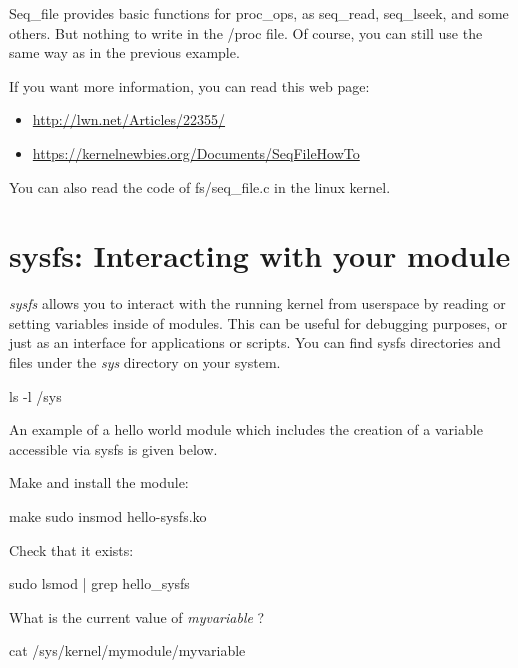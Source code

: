 \documentclass[10pt, oneside]{book}
\begin{document}
Seq\_file provides basic functions for proc\_ops, as seq\_read, seq\_lseek, and some others. But nothing to write in the /proc file. Of course, you can still use the same way as in the previous example.


If you want more information, you can read this web page:

\begin{itemize}
\item \url{http://lwn.net/Articles/22355/}

\item \url{https://kernelnewbies.org/Documents/SeqFileHowTo}
\end{itemize}


You can also read the code of fs/seq\_file.c in the linux kernel.

\section{sysfs: Interacting with your module}
\label{sec:orgdb0ef18}
\emph{sysfs} allows you to interact with the running kernel from userspace by reading or setting variables inside of modules. This can be useful for debugging purposes, or just as an interface for applications or scripts. You can find sysfs directories and files under the \emph{sys} directory on your system.

\begin{codebash}
ls -l /sys
\end{codebash}

An example of a hello world module which includes the creation of a variable accessible via sysfs is given below.


Make and install the module:

\begin{codebash}
make
sudo insmod hello-sysfs.ko
\end{codebash}

Check that it exists:

\begin{codebash}
sudo lsmod | grep hello_sysfs
\end{codebash}

What is the current value of \emph{myvariable} ?

\begin{codebash}
cat /sys/kernel/mymodule/myvariable
\end{codebash}
\end{document}
